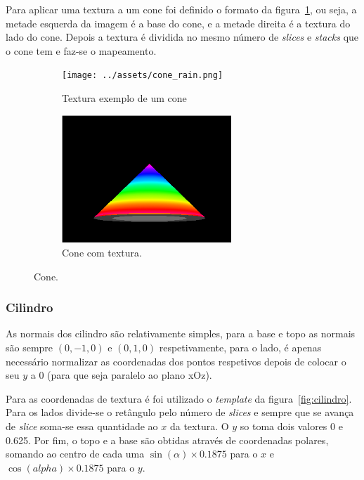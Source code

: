 \documentclass[a4paper]{article}
\begin{document}
Para aplicar uma textura a um cone foi definido o formato da
figura~\ref{fig:conetexture}, ou seja, a metade esquerda da imagem é a base do
cone, e a metade direita é a textura do lado do cone. Depois a textura é
dividida no mesmo número de \textit{slices} e \textit{stacks} que o cone tem e
faz-se o mapeamento.

\begin{figure}[H]
    \centering
    \begin{subfigure}{0.4\textwidth}
        \centering
        \texttt{[image: ../assets/cone\_rain.png]}
        \caption{Textura exemplo de um cone}
    \end{subfigure}
    \begin{subfigure}{0.4\textwidth}
        \centering
        \includegraphics[width=0.7\textwidth]{cone.png}
        \caption{Cone com textura.}
    \end{subfigure}
    \caption{Cone.}\label{fig:conetexture}
\end{figure}

\subsubsection{Cilindro}
As normais dos cilindro são relativamente simples, para a base e topo as
normais são sempre $(0,-1,0)$ e $(0,1,0)$ respetivamente, para o lado, é apenas
necessário normalizar as coordenadas dos pontos respetivos depois de colocar o
seu $y$ a 0 (para que seja paralelo ao plano xOz).

Para as coordenadas de textura é foi utilizado o \textit{template} da
figura~\ref{fig:cilindro}. Para os lados divide-se o retângulo pelo número de
\textit{slices} e sempre que se avança de \textit{slice} soma-se essa quantidade
ao $x$ da textura. O $y$ so toma dois valores 0 e 0.625. Por fim, o topo e a
base são obtidas através de coordenadas polares, somando ao centro de cada uma
$\sin(\alpha) \times 0.1875$ para o $x$ e $\cos(alpha) \times 0.1875$ para o $y$.
\end{document}
